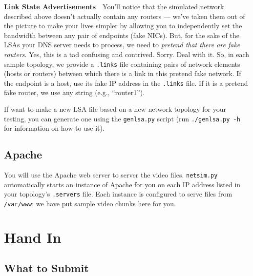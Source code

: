 \documentclass{article}
\begin{document}
\medskip \noindent \textbf{Link State Advertisements}~~You'll notice that the
simulated network described above doesn't actually contain any routers ---
we've taken them out of the picture to make your lives simpler by allowing you
to independently set the bandwidth between any pair of endpoints (fake NICs).
But, for the sake of the LSAs your DNS server needs to process, we need to
\emph{pretend that there are fake routers}. Yes, this is a tad confusing and
contrived. Sorry. Deal with it. So, in each sample topology, we provide a
\texttt{.links} file containing pairs of network elements (hosts or routers)
between which there is a link in this pretend fake network. If the endpoint is
a host, use its fake IP address in the \texttt{.links} file. If it is a pretend
fake router, we use any string (e.g., ``router1'').

If want to make a new LSA file based on a new network topology for your
testing, you can generate one using the \texttt{genlsa.py} script (run
\texttt{./genlsa.py -h} for information on how to use it).





%



\subsection{Apache}
\label{sec:apache}

You will use the Apache web server to server the video files.
\texttt{netsim.py} automatically starts an instance of Apache for you on each
IP address listed in your topology's \texttt{.servers} file. Each instance is
configured to serve files from \texttt{/var/www}; we have put sample video
chunks here for you.




\section{Hand In}

\subsection{What to Submit}
\end{document}
